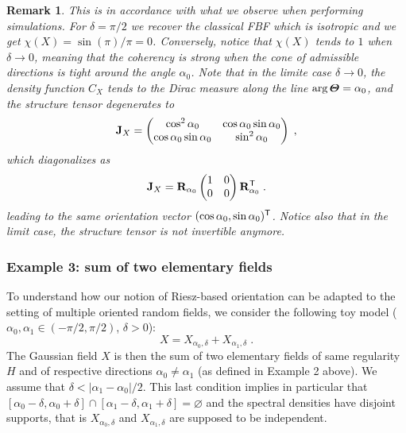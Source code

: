 \documentclass{elsarticle}
\newtheorem{remark}{Remark}
\begin{document}
\begin{remark}
This is in accordance with what we observe when performing simulations. For $\delta=\pi/2$ we recover the classical FBF which is isotropic and we get $\chi(X)=\sin(\pi)/\pi=0$. Conversely, notice that $\chi(X)$ tends to $1$ when $\delta\to 0$, meaning that the coherency is strong when the cone of admissible directions is tight around the angle $\alpha_0$. Note that in the limite case $\delta\to 0$, the density function $C_X$ tends to the Dirac measure along the line $\arg \bm{\Theta}=\alpha_0$, and the structure tensor degenerates to 
\begin{equation*}
\mathbf{J}_X= 
\begin{pmatrix}\cos^2 \alpha_0 & \cos \alpha_0\sin \alpha_0\\  
\cos \alpha_0\sin  \alpha_0 & \sin^2 \alpha_0
\end{pmatrix}\;,
\end{equation*}
which diagonalizes as
\[
\mathbf{J}_X= \mathbf{R}_{\alpha_0}\begin{pmatrix}1 & 0\\ 0 & 0\end{pmatrix}\mathbf{R}_{\alpha_0}^{\mathsf{T}}\;.
\]
leading to the same orientation vector $(\cos \alpha_0, \sin \alpha_0)^{\mathsf{T}}$. Notice also that in the limit case, the structure tensor is not invertible anymore.
\end{remark}
\subsubsection{Example 3: sum of two elementary fields\\}\label{s:wav:based:orientation:ssi:ex3}

To understand how our notion of  Riesz-based orientation can be adapted to the setting of multiple oriented random fields, we consider the following toy model ($\alpha_0, \alpha_1 \in (-\pi/2,\pi/2)$, $\delta>0$):
\[
X=X_{\alpha_0,\delta}+X_{\alpha_1,\delta}\;.
\] 
The Gaussian field $X$ is then the sum of two elementary fields of same regularity $H$ and of respective directions $\alpha_0\neq\alpha_1$ (as defined in Example 2 above).
We assume that $\delta < |\alpha_1-\alpha_0|/2$. This last condition implies in particular that $[\alpha_0-\delta,\alpha_0+\delta]\cap [\alpha_1-\delta,\alpha_1+\delta]=\varnothing$ and the spectral densities have disjoint supports, that is $X_{\alpha_0,\delta}$ and $X_{\alpha_1,\delta}$ are supposed to be independent. 
\end{document}
